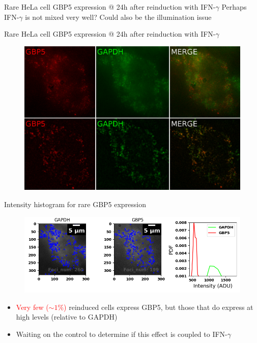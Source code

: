 \documentclass[aspectratio=1610]{beamer}					%
\begin{document}
\begin{frame}{Rare HeLa cell GBP5 expression @ 24h after reinduction with IFN-$\gamma$}
Perhaps IFN-$\gamma$ is not mixed very well?
Could also be the illumination issue
\end{frame}

\begin{frame}{Rare HeLa cell GBP5 expression @ 24h after reinduction with IFN-$\gamma$}
\begin{figure}
\includegraphics[width=12cm]{Stains.png}
\end{figure}
\end{frame}

\begin{frame}{Intensity histogram for rare GBP5 expression}
\begin{figure}
\includegraphics[width=14cm]{Detection.png}
\end{figure}
\begin{itemize}
\item \textcolor{red}{Very few ($\sim 1\%$)} reinduced cells express GBP5, but those that do express at high levels (relative to GAPDH)
\item Waiting on the control to determine if this effect is coupled to IFN-$\gamma$ 
\end{itemize}
\end{frame}
\end{document}
